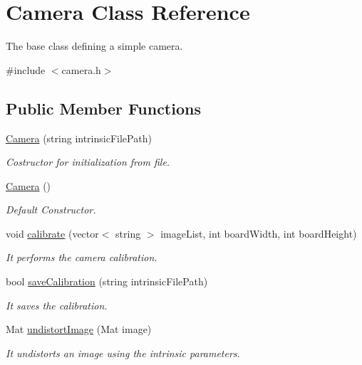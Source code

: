 \section{Camera Class Reference}
\label{classCamera}


The base class defining a simple camera.  




{\ttfamily \#include $<$camera.\+h$>$}

\subsection*{Public Member Functions}
\begin{DoxyCompactItemize}
\item 
\mbox{\hyperlink{classCamera_a4a02314716bac5282edd6aee6457f133}{Camera}} (string intrinsic\+File\+Path)
\begin{DoxyCompactList}\small\item\em Costructor for initialization from file. \end{DoxyCompactList}\item 
\mbox{\hyperlink{classCamera_a01f94c3543f56ede7af49dc778f19331}{Camera}} ()
\begin{DoxyCompactList}\small\item\em Default Constructor. \end{DoxyCompactList}\item 
void \mbox{\hyperlink{classCamera_a2498b18efe884472517a430db83d9c74}{calibrate}} (vector$<$ string $>$ image\+List, int board\+Width, int board\+Height)
\begin{DoxyCompactList}\small\item\em It performs the camera calibration. \end{DoxyCompactList}\item 
bool \mbox{\hyperlink{classCamera_a979043e0e738bf3858de6476e12b5a67}{save\+Calibration}} (string intrinsic\+File\+Path)
\begin{DoxyCompactList}\small\item\em It saves the calibration. \end{DoxyCompactList}\item 
Mat \mbox{\hyperlink{classCamera_ae261c6f36e0b9c6aa40917b60ae7b1fa}{undistort\+Image}} (Mat image)
\begin{DoxyCompactList}\small\item\em It undistorts an image using the intrinsic parameters. \end{DoxyCompactList}\item 

\end{DoxyCompactItemize}
